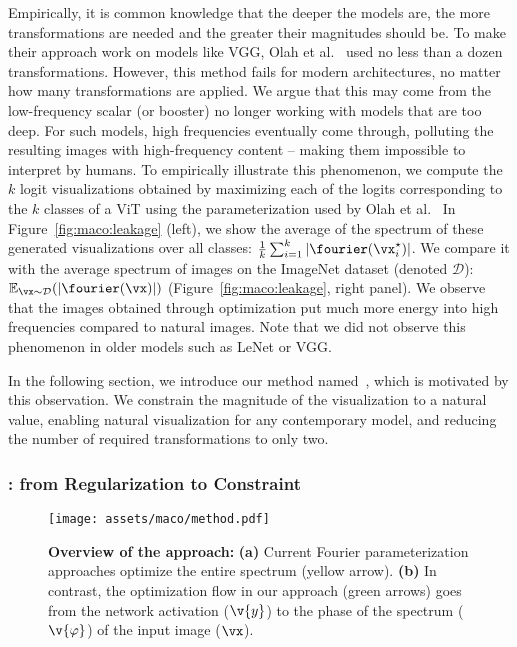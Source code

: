 Empirically, it is common knowledge that the deeper the models are, the more transformations are needed and the greater their magnitudes should be. To make their approach work on models like VGG, Olah et al.~\cite{olah2017feature} used no less than a dozen transformations. However, this method fails for modern architectures, no matter how many transformations are applied. We argue that this may come from the low-frequency scalar (or booster) no longer working with models that are too deep. For such models, high frequencies eventually come through, polluting the resulting images with high-frequency content -- making them impossible to interpret by humans. %
To empirically illustrate this phenomenon, we compute the $k$ logit visualizations obtained by maximizing each of the logits corresponding to the $k$ classes of a ViT using the parameterization used by Olah et al.~ In Figure~\ref{fig:maco:leakage} (left), we show the average of the spectrum of these generated visualizations over all classes: $\frac{1}{k} \sum_{i=1}^k |\fourier(\vx^\star_i)|$. We compare it with the average spectrum of images on the ImageNet dataset (denoted $\mathcal{D}$): $\mathbb{E}_{\vx \sim \mathcal{D}}(|\fourier(\vx)|)$ (Figure~\ref{fig:maco:leakage}, right panel).
We observe that the images obtained through optimization put much more energy into high frequencies compared to natural images. Note that we did not observe this phenomenon in older models such as LeNet or VGG.

In the following section, we introduce our method named~\magfv, which is motivated by this observation. We constrain the magnitude of the visualization to a natural value, enabling natural visualization for any contemporary model, and reducing the number of required transformations to only two.


\subsubsection{\magfv: from Regularization to Constraint}
\begin{figure}[t!]
\center
\texttt{[image: assets/maco/method.pdf]}
\caption{\textbf{Overview of the approach:} \textbf{(a)}  Current Fourier parameterization approaches optimize the entire spectrum (yellow arrow). \textbf{(b)}  In contrast,  the optimization flow in our approach (green arrows) goes from the network activation ($\v{y}$) to the phase of the spectrum ($\v{\varphi}$) of the input image ($\vx$).}

\label{fig:maco:method}
\end{figure}

